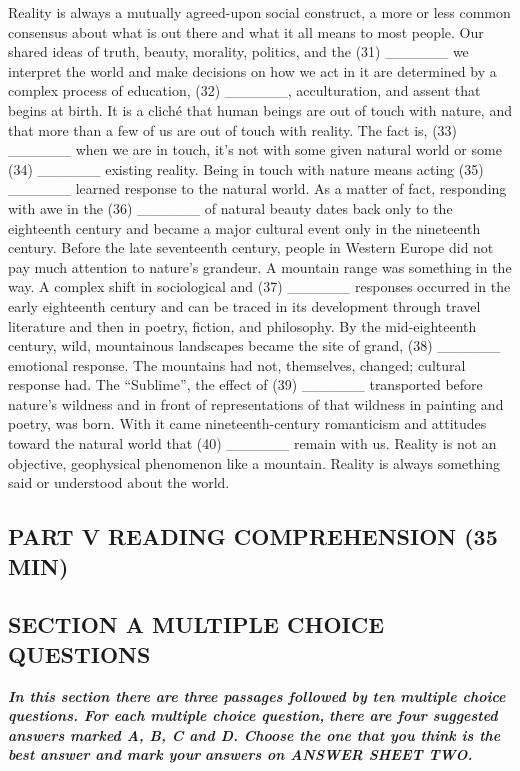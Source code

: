 \documentclass[UTF8,11pt]{ctexart}
\begin{document}
Reality is always a mutually agreed-upon social construct, a more or less common consensus about what is out there and what it all means to most people. Our shared ideas of truth, beauty, morality, politics, and the (31) \_\_\_\_\_\_ we interpret the world and make decisions on how we act in it are determined by a complex process of education, (32) \_\_\_\_\_\_, acculturation, and assent that begins at birth. It is a cliché that human beings are out of touch with nature, and that more than a few of us are out of touch with reality. The fact is, (33) \_\_\_\_\_\_ when we are in touch, it’s not with some given natural world or some (34) \_\_\_\_\_\_ existing reality. Being in touch with nature means acting (35) \_\_\_\_\_\_ learned response to the natural world. As a matter of fact, responding with awe in the (36) \_\_\_\_\_\_ of natural beauty dates back only to the eighteenth century and became a major cultural event only in the nineteenth century. Before the late seventeenth century, people in Western Europe did not pay much attention to nature’s grandeur. A mountain range was something in the way. A complex shift in sociological and (37) \_\_\_\_\_\_ responses occurred in the early eighteenth century and can be traced in its development through travel literature and then in poetry, fiction, and philosophy. By the mid-eighteenth century, wild, mountainous landscapes became the site of grand, (38) \_\_\_\_\_\_ emotional response. The mountains had not, themselves, changed; cultural response had. The “Sublime”, the effect of (39) \_\_\_\_\_\_ transported before nature’s wildness and in front of representations of that wildness in painting and poetry, was born. With it came nineteenth-century romanticism and attitudes toward the natural world that (40) \_\_\_\_\_\_ remain with us. Reality is not an objective, geophysical phenomenon like a mountain. Reality is always something said or understood about the world.


\subsection*{\textbf{PART} \textbf{V READING COMPREHENSION (35 MIN)}}


\subsection*{\textbf{SECTION A MULTIPLE CHOICE QUESTIONS}}


\textbf{\textit{In this section there are three passages followed by ten multiple choice questions. For each multiple choice question,}} \textbf{\textit{there are four suggested answers marked A, B, C and D. Choose the one that you think is the best answer and mark your}} \textbf{\textit{answers on ANSWER SHEET TWO.}}
\end{document}
